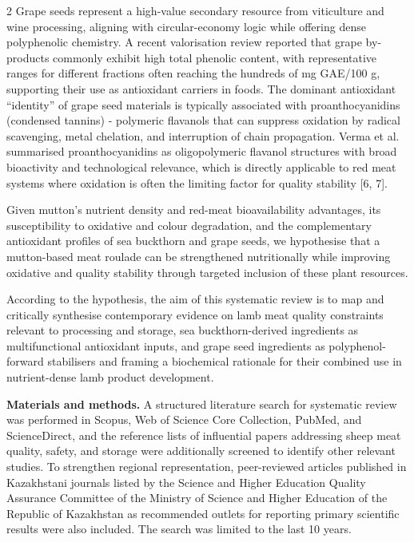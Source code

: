 \begin{multicols}{2}
Grape seeds represent a high-value secondary resource from viticulture
and wine processing, aligning with circular-economy logic while offering
dense polyphenolic chemistry. A recent valorisation review reported that
grape by-products commonly exhibit high total phenolic content, with
representative ranges for different fractions often reaching the
hundreds of mg GAE/100 g, supporting their use as antioxidant carriers
in foods. The dominant antioxidant ``identity'' of grape seed materials
is typically associated with proanthocyanidins (condensed tannins) -
polymeric flavanols that can suppress oxidation by radical scavenging,
metal chelation, and interruption of chain propagation. Verma et al.
summarised proanthocyanidins as oligopolymeric flavanol structures with
broad bioactivity and technological relevance, which is directly
applicable to red meat systems where oxidation is often the limiting
factor for quality stability {[}6, 7{]}.

Given mutton's nutrient density and red-meat bioavailability advantages,
its susceptibility to oxidative and colour degradation, and the
complementary antioxidant profiles of sea buckthorn and grape seeds, we
hypothesise that a mutton-based meat roulade can be strengthened
nutritionally while improving oxidative and quality stability through
targeted inclusion of these plant resources.

According to the hypothesis, the aim of this systematic review is to map
and critically synthesise contemporary evidence on lamb meat quality
constraints relevant to processing and storage, sea buckthorn-derived
ingredients as multifunctional antioxidant inputs, and grape seed
ingredients as polyphenol-forward stabilisers and framing a biochemical
rationale for their combined use in nutrient-dense lamb product
development.

{\bfseries Materials and methods.} A structured literature search for
systematic review was performed in Scopus, Web of Science Core
Collection, PubMed, and ScienceDirect, and the reference lists of
influential papers addressing sheep meat quality, safety, and storage
were additionally screened to identify other relevant studies. To
strengthen regional representation, peer-reviewed articles published in
Kazakhstani journals listed by the Science and Higher Education Quality
Assurance Committee of the Ministry of Science and Higher Education of
the Republic of Kazakhstan as recommended outlets for reporting primary
scientific results were also included. The search was limited to the
last 10 years.


\end{multicols}
